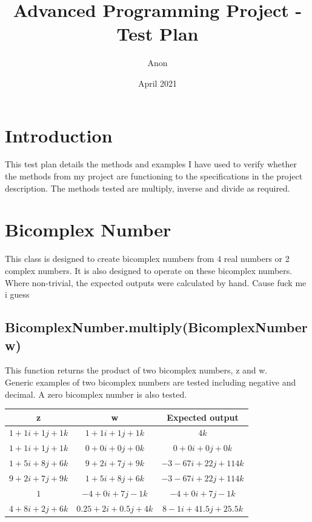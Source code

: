 \documentclass[12pt, a4]{amsart}
\title{Advanced Programming Project - Test Plan}
\date{April 2021}
\author{Anon}
\begin{document}
\maketitle
\tableofcontents

	\section{Introduction}
	
		This test plan details the methods and examples I have used to verify whether the methods from my project are functioning to the specifications in the project description. The 
		methods tested are multiply, inverse and divide as required.
	
	\section{Bicomplex Number}
	
		This class is designed to create bicomplex numbers from 4 real numbers or 2 complex numbers. It is also designed to operate on these bicomplex numbers. \\
		Where non-trivial, the expected outputs were calculated by hand. \color{white} Cause fuck me i guess \color{black}
	
	\subsection{BicomplexNumber.multiply(BicomplexNumber w)}
	
		This function returns the product of two bicomplex numbers, z and w. \\
		Generic examples of two bicomplex numbers are tested including negative and decimal. A zero bicomplex number is also tested. \\
	
			\begin{tabular}{ c c c }
			\hline
			z & w & Expected output \\
			\hline
			\hline
			$1 + 1i + 1j + 1k$ & $1 + 1i + 1j + 1k$ & $4k$ \\ 
			$1 + 1i + 1j + 1k$ & $0 + 0i + 0j + 0k$ & $0 + 0i + 0j + 0k$ \\ 
			$1 + 5i + 8j + 6k$ & $9 + 2i + 7j + 9k$ & $-3 - 67i +22j + 114k$ \\ 
			$9 + 2i + 7j + 9k$ & $1 + 5i + 8j + 6k$ & $-3	-67i +22j + 114k$ \\ 
			$1$ & $-4 + 0i + 7j - 1k$ & $-4 + 0i + 7j - 1k$ \\ 
			$4 + 8i + 2j + 6k$ & $0.25 + 2i + 0.5j + 4k$ & $8 - 1i +41.5j + 25.5k$ \\ 
			\hline
			\end{tabular} \\
	
\end{document}
